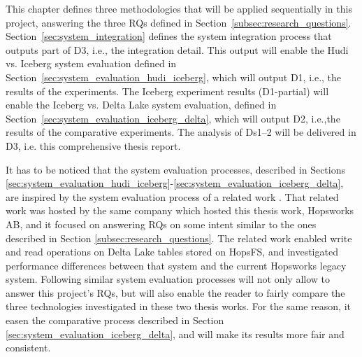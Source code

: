 This chapter defines three methodologies that will be applied sequentially in this project, answering the three \glspl{RQ} defined in Section~\ref{subsec:research_questions}. Section~\ref{sec:system_integration} defines the system integration process that outputs part of \gls{D}3, i.e., the integration detail. This output will enable the Hudi vs. Iceberg system evaluation defined in Section~\ref{sec:system_evaluation_hudi_iceberg}, which will output \gls{D}1, i.e., the results of the experiments. The Iceberg experiment results (\gls{D}1-partial) will enable the Iceberg vs. Delta Lake system evaluation, defined in Section~\ref{sec:system_evaluation_iceberg_delta}, which will output \gls{D}2, i.e.,the results of the comparative experiments. The analysis of \glspl{D}1--2 will be delivered in \gls{D}3, i.e. this comprehensive thesis report.

It has to be noticed that the system evaluation processes, described in Sections \ref{sec:system_evaluation_hudi_iceberg}-\ref{sec:system_evaluation_iceberg_delta}, are inspired by the system evaluation process of a related work \cite{manfrediReducingReadWrite2024}. That related work was hosted by the same company which hosted this thesis work, Hopsworks AB, and it focused on answering \glspl{RQ} on some intent similar to the ones described in Section \ref{subsec:research_questions}. The related work enabled write and read operations on Delta Lake tables stored on \gls{HopsFS}, and investigated performance differences between that system and the current Hopsworks legacy system. Following similar system evaluation processes will not only allow to answer this project's \glspl{RQ}, but will also enable the reader to fairly compare the three technologies investigated in these two thesis works. For the same reason, it easen the comparative process described in Section \ref{sec:system_evaluation_iceberg_delta}, and will make its results more fair and consistent.